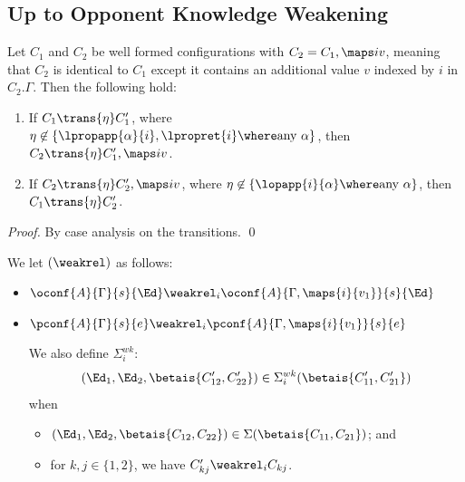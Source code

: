 \subsection{Up to Opponent Knowledge Weakening}

\begin{lemma}\label{lem:lts-weaken}%
  Let $C_1$ and $C_2$ be well formed configurations with $C_2 = C_1,\maps i v$, meaning that $C_2$ is identical to $C_1$ except it contains an additional value $v$ indexed by $i$ in $C_2.\Gamma$.
  Then the following hold:
  \begin{enumerate}
    \item
      If $C_1 \trans{\eta} C_1'$,
      where $\eta\not\in\{\lpropapp{\alpha}{i},\lpropret{i}\where \text{any } \alpha\}$,
      then
      $C_2 \trans{\eta} C_1',\maps i v$.
    \item
      If $C_2 \trans{\eta} C_2',\maps i v$,
      where $\eta\not\in\{\lopapp{i}{\alpha}\where \text{any } \alpha\}$,
      then $C_1 \trans{\eta} C_2'$.

  \end{enumerate}
\end{lemma}
\begin{proof}
By case analysis on the transitions.
\qed\end{proof}
\begin{definition} \label{def:gamma-weak}%
  We let $(\weakrel)$ as follows:
  \begin{itemize}

    \item $\oconf{A}{\Gamma}{s}{\Ed} \weakrel_i \oconf{A}{\Gamma,\maps{i}{v_1}}{s}{\Ed}$

    \item $\pconf{A}{\Gamma}{s}{e} \weakrel_i \pconf{A}{\Gamma,\maps{i}{v_1}}{s}{e}$

  We also define $\Sigma^{wk}_i$:
  \begin{align*}
    (\Ed_1,\Ed_2,\betais{C'_{12},C'_{22}})\in \Sigma^{wk}_i(\betais{C'_{11},C'_{21}})
  \end{align*}
  when
  \begin{itemize}
    \item
      $(\Ed_1,\Ed_2,\betais{C_{12},C_{22}})\in \Sigma(\betais{C_{11},C_{21}})$; and
    \item
      for $k,j\in\{1,2\}$, we have $C_{kj}' \weakrel_{i} C_{kj}$.
  \end{itemize}

  \end{itemize}
\end{definition}
